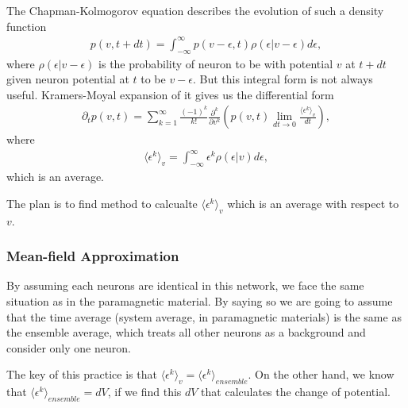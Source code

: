 \documentclass[letterpaper,10pt,english]{sphinxmanual}
\begin{document}
The Chapman-Kolmogorov equation describes the evolution of such a density function
\begin{equation*}
\begin{split}p(v,t+dt) = \int_{-\infty}^\infty p(v-\epsilon,t)\rho(\epsilon\vert v-\epsilon) d\epsilon,\end{split}
\end{equation*}
where \(\rho(\epsilon\vert v-\epsilon)\) is the probability of neuron to be with potential \(v\) at \(t+dt\) given neuron potential at \(t\) to be \(v-\epsilon\). But this integral form is not always useful. Kramers-Moyal expansion of it gives us the differential form
\label{\detokenize{topics/mean-field:equation-eqn-prob-density-equation-with-kramers-moyal-expansion}}\begin{equation}\label{equation:topics/mean-field:eqn-prob-density-equation-with-kramers-moyal-expansion}
\begin{split}\partial_t p(v,t) = \sum_{k=1}^\infty \frac{ (-1)^k }{k!} \frac{\partial^k}{\partial v^k} \left( p(v,t) \lim_{dt\to 0} \frac{ \langle \epsilon^k\rangle_v }{dt} \right),\end{split}
\end{equation}
where
\begin{equation*}
\begin{split}\langle \epsilon^k\rangle_v = \int_{-\infty}^\infty \epsilon^k\rho(\epsilon\vert v) d\epsilon,\end{split}
\end{equation*}
which is an average.

The plan is to find method to calcualte \(\langle \epsilon^k \rangle_v\) which is an average with respect to \(v\).


\subsubsection{Mean-field Approximation}
\label{\detokenize{topics/mean-field:mean-field-approximation}}
By assuming each neurons are identical in this network, we face the same situation as in the paramagnetic material. By saying so we are going to assume that the time average (system average, in paramagnetic materials) is the same as the ensemble average, which treats all other neurons as a background and consider only one neuron.

The key of this practice is that \(\langle \epsilon^k \rangle_v = \langle \epsilon^k \rangle_{ensemble}\). On the other hand, we know that \(\langle \epsilon^k \rangle_{ensemble} = dV\), if we find this \(dV\) that calculates the change of potential.
\end{document}
